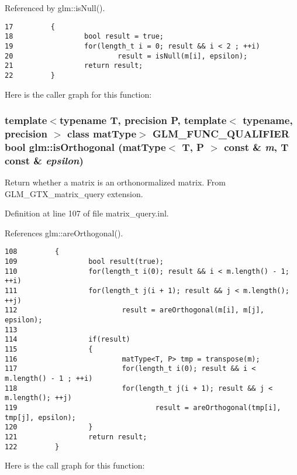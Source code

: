 Referenced by glm::isNull().

\begin{Code}\begin{verbatim}17         {
18                 bool result = true;
19                 for(length_t i = 0; result && i < 2 ; ++i)
20                         result = isNull(m[i], epsilon);
21                 return result;
22         }
\end{verbatim}
\end{Code}




Here is the caller graph for this function:\hypertarget{group__gtx__matrix__query_gbaeee016acd42f7a58bd1de063a3061b}{
\subsubsection[isOrthogonal]{\setlength{\rightskip}{0pt plus 5cm}template$<$typename T, precision P, template$<$ typename, precision $>$ class matType$>$ GLM\_\-FUNC\_\-QUALIFIER bool glm::isOrthogonal (matType$<$ T, P $>$ const \& {\em m}, \/  T const \& {\em epsilon})}}
\label{group__gtx__matrix__query_gbaeee016acd42f7a58bd1de063a3061b}


Return whether a matrix is an orthonormalized matrix. From GLM\_\-GTX\_\-matrix\_\-query extension. 

Definition at line 107 of file matrix\_\-query.inl.

References glm::areOrthogonal().

\begin{Code}\begin{verbatim}108         {
109                 bool result(true);
110                 for(length_t i(0); result && i < m.length() - 1; ++i)
111                 for(length_t j(i + 1); result && j < m.length(); ++j)
112                         result = areOrthogonal(m[i], m[j], epsilon);
113 
114                 if(result)
115                 {
116                         matType<T, P> tmp = transpose(m);
117                         for(length_t i(0); result && i < m.length() - 1 ; ++i)
118                         for(length_t j(i + 1); result && j < m.length(); ++j)
119                                 result = areOrthogonal(tmp[i], tmp[j], epsilon);
120                 }
121                 return result;
122         }
\end{verbatim}
\end{Code}




Here is the call graph for this function: